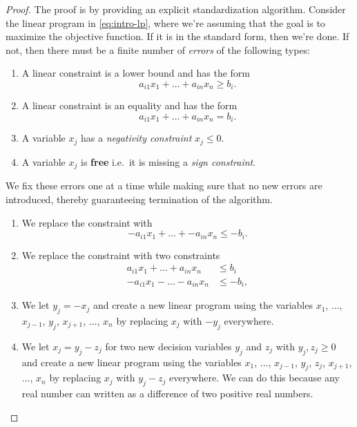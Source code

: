 \documentclass[
]{book}
\providecommand{\tightlist}{%
  \setlength{\itemsep}{0pt}\setlength{\parskip}{0pt}}
\theoremstyle{definition}
\theoremstyle{definition}
\theoremstyle{definition}
\theoremstyle{definition}
\theoremstyle{remark}
\begin{document}
\begin{proof}

The proof is by providing an explicit standardization algorithm. Consider the linear program in \eqref{eq:intro-lp}, where we're assuming that the goal is to maximize the objective function. If it is in the standard form, then we're done. If not, then there must be a finite number of \emph{errors} of the following types:

\begin{enumerate}
\def\labelenumi{\arabic{enumi}.}
\tightlist
\item
  A linear constraint is a lower bound and has the form \[a_{i1} x_1 + \dots + a_{in} x_n \geq b_i.\]
\item
  A linear constraint is an equality and has the form \[a_{i1} x_1 + \dots + a_{in} x_n = b_i.\]
\item
  A variable \(x_j\) has a \emph{negativity constraint} \(x_j \leq 0\).
\item
  A variable \(x_j\) is \textbf{free} i.e.~it is missing a \emph{sign constraint}.
\end{enumerate}

We fix these errors one at a time while making sure that no new errors are introduced, thereby guaranteeing termination of the algorithm.

\begin{enumerate}
\def\labelenumi{\arabic{enumi}.}
\tightlist
\item
  We replace the constraint with \[ -a_{i1} x_1 + \dots + -a_{in} x_n \leq -b_i. \]
\item
  We replace the constraint with two constraints
  \begin{align*}
    a_{i1} x_1 + \dots + a_{in} x_n &\leq b_i \\
    -a_{i1} x_1 - \dots - a_{in} x_n &\leq -b_i,
    \end{align*}
\item
  We let \(y_j = -x_j\) and create a new linear program using the variables \(x_1\), \(\dots\), \(x_{j-1}\), \(y_j\), \(x_{j+1}\), \(\dots\), \(x_n\) by replacing \(x_j\) with \(-y_j\) everywhere.
\item
  We let \(x_j = y_j - z_j\) for two new decision variables \(y_j\) and \(z_j\) with \(y_j, z_j \geq 0\) and create a new linear program using the variables \(x_1\), \(\dots\), \(x_{j-1}\), \(y_j\), \(z_j\), \(x_{j+1}\), \(\dots\), \(x_n\) by replacing \(x_j\) with \(y_j - z_j\) everywhere. We can do this because any real number can written as a difference of two positive real numbers.
\end{enumerate}

\end{proof}
\end{document}
